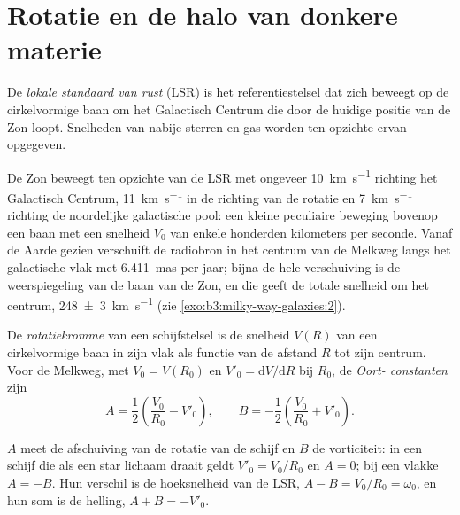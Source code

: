 \section{Rotatie en de halo van donkere materie}\label{sec:b3:milky-way-galaxies:rotation}

\begin{definition}\label{def:b3:milky-way-galaxies:lsr}
De \emph{lokale standaard van rust} (LSR) is
het referentiestelsel dat zich beweegt op de cirkelvormige baan om het Galactisch
Centrum die door de huidige positie van de Zon loopt. Snelheden van nabije
sterren en gas worden ten opzichte ervan opgegeven.
\end{definition}

De Zon beweegt ten opzichte van de LSR met ongeveer \qty{10}{km.s^{-1}} richting het
Galactisch Centrum, \qty{11}{km.s^{-1}} in de richting van de rotatie en
\qty{7}{km.s^{-1}} richting de noordelijke galactische pool: een kleine peculiaire
beweging bovenop een baan met een snelheid $V_0$ van enkele honderden kilometers
per seconde. Vanaf de Aarde gezien verschuift de radiobron in het centrum van de
Melkweg langs het galactische vlak met \qty{6.411}{mas} per jaar; bijna
de hele verschuiving is de weerspiegeling van de baan van de Zon, en die geeft de
totale snelheid om het centrum, \qty[separate-uncertainty=true]{248 \pm 3}{km.s^{-1}}
(zie \cref{exo:b3:milky-way-galaxies:2}).

\begin{definition}\label{def:b3:milky-way-galaxies:rotation-curve}
De \emph{rotatiekromme} van een schijfstelsel is de
snelheid $V(R)$ van een cirkelvormige baan in zijn vlak als functie van de
afstand $R$ tot zijn centrum. Voor de Melkweg, met $V_0 = V(R_0)$ en
$V'_0 = \mathrm{d}V/\mathrm{d}R$ bij $R_0$, de \emph{Oort-
constanten} zijn
\[
A = \frac12\left(\frac{V_0}{R_0} - V'_0\right), \qquad
B = -\frac12\left(\frac{V_0}{R_0} + V'_0\right).
\]
\end{definition}

$A$ meet de afschuiving van de rotatie van de schijf en $B$ de vorticiteit: in een
schijf die als een star lichaam draait geldt $V'_0 = V_0/R_0$ en $A = 0$; bij een vlakke
 $A = -B$. Hun verschil is de hoeksnelheid van de LSR,
$A - B = V_0/R_0 = \omega_0$, en hun som is de helling, $A + B = -V'_0$.

